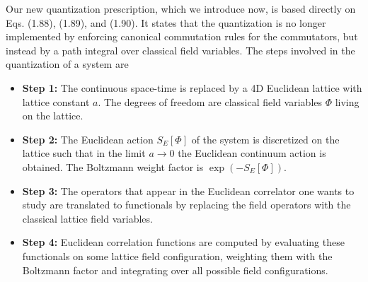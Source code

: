 Our new quantization prescription, which we introduce now, is based directly on
Eqs. (1.88), (1.89), and (1.90). It states that the quantization is no longer
implemented by enforcing canonical commutation rules for the commutators, but
instead by a path integral over classical field variables. The steps involved
in the quantization of a system are
\begin{itemize}
  \item \textbf{Step 1:} The continuous space-time is replaced by a 4D
        Euclidean lattice with lattice constant $a$. The degrees of freedom are
        classical field variables $\Phi$ living on the lattice.
  \item \textbf{Step 2:} The Euclidean action $S_E[\Phi]$ of the system is
        discretized on the lattice such that in the limit $a \to 0$ the
        Euclidean continuum action is obtained. The Boltzmann weight factor is
        $\exp(-S_E[\Phi])$.
  \item \textbf{Step 3:} The operators that appear in the Euclidean correlator
        one wants to study are translated to functionals by replacing the field
        operators with the classical lattice field variables.
  \item \textbf{Step 4:} Euclidean correlation functions are computed by
        evaluating these functionals on some lattice field configuration,
        weighting them with the Boltzmann factor and integrating over all
        possible field configurations.
\end{itemize}

